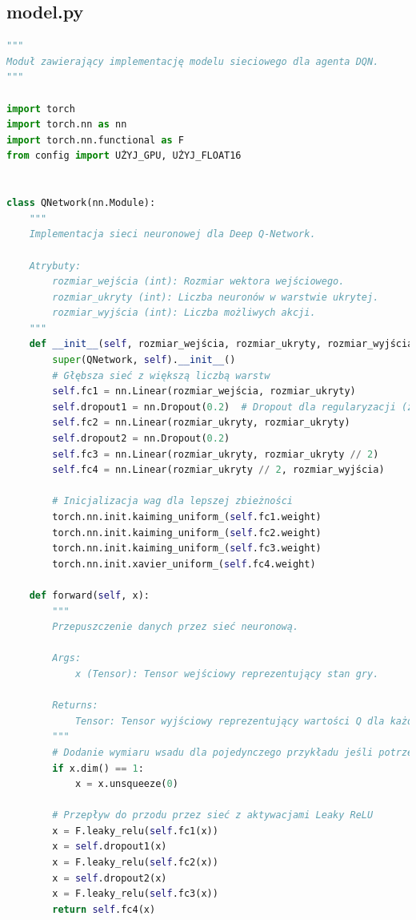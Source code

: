 \documentclass[a4paper,12pt]{article}
\begin{document}
\subsection{model.py}
\begin{lstlisting}[language=Python]
  """
Moduł zawierający implementację modelu sieciowego dla agenta DQN.
"""

import torch
import torch.nn as nn
import torch.nn.functional as F
from config import UŻYJ_GPU, UŻYJ_FLOAT16


class QNetwork(nn.Module):
    """
    Implementacja sieci neuronowej dla Deep Q-Network.
    
    Atrybuty:
        rozmiar_wejścia (int): Rozmiar wektora wejściowego.
        rozmiar_ukryty (int): Liczba neuronów w warstwie ukrytej.
        rozmiar_wyjścia (int): Liczba możliwych akcji.
    """
    def __init__(self, rozmiar_wejścia, rozmiar_ukryty, rozmiar_wyjścia):
        super(QNetwork, self).__init__()
        # Głębsza sieć z większą liczbą warstw
        self.fc1 = nn.Linear(rozmiar_wejścia, rozmiar_ukryty)
        self.dropout1 = nn.Dropout(0.2)  # Dropout dla regularyzacji (zapobiega przeuczeniu)
        self.fc2 = nn.Linear(rozmiar_ukryty, rozmiar_ukryty)
        self.dropout2 = nn.Dropout(0.2)
        self.fc3 = nn.Linear(rozmiar_ukryty, rozmiar_ukryty // 2)
        self.fc4 = nn.Linear(rozmiar_ukryty // 2, rozmiar_wyjścia)
        
        # Inicjalizacja wag dla lepszej zbieżności
        torch.nn.init.kaiming_uniform_(self.fc1.weight)
        torch.nn.init.kaiming_uniform_(self.fc2.weight)
        torch.nn.init.kaiming_uniform_(self.fc3.weight)
        torch.nn.init.xavier_uniform_(self.fc4.weight)
        
    def forward(self, x):
        """
        Przepuszczenie danych przez sieć neuronową.
        
        Args:
            x (Tensor): Tensor wejściowy reprezentujący stan gry.
            
        Returns:
            Tensor: Tensor wyjściowy reprezentujący wartości Q dla każdej akcji.
        """
        # Dodanie wymiaru wsadu dla pojedynczego przykładu jeśli potrzeba
        if x.dim() == 1:
            x = x.unsqueeze(0)
            
        # Przepływ do przodu przez sieć z aktywacjami Leaky ReLU
        x = F.leaky_relu(self.fc1(x))
        x = self.dropout1(x)
        x = F.leaky_relu(self.fc2(x))
        x = self.dropout2(x)
        x = F.leaky_relu(self.fc3(x))
        return self.fc4(x)

\end{lstlisting}
\end{document}
